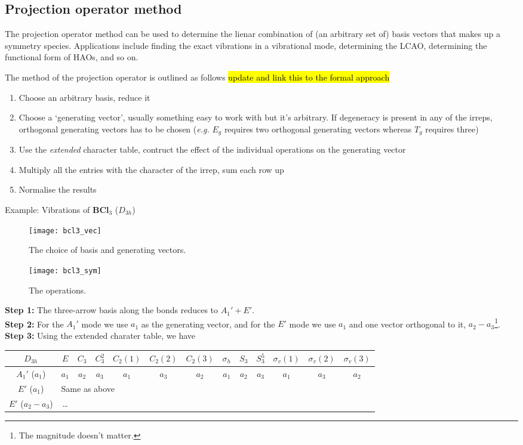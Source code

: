 \subsection{Projection operator method}
The projection operator method can be used to determine the lienar combination of (an arbitrary set of) basis vectors that makes up a symmetry species. Applications include finding the exact vibrations in a vibrational mode, determining the LCAO, determining the functional form of HAOs, and so on. \par
The method of the projection operator is outlined as follows \hl{update and link this to the formal approach}
\begin{enumerate}
	\item Choose an arbitrary basis, reduce it
	\item Choose a `generating vector', usually something easy to work with but it's arbitrary. If degeneracy is present in any of the irreps, orthogonal generating vectors has to be chosen (\emph{e.g.} $E_g$ requires two orthogonal generating vectors whereas $T_g$ requires three)
	\item Use the \emph{extended} character table, contruct the effect of the individual operations on the generating vector
	\item Multiply all the entries with the character of the irrep, sum each row up
	\item Normalise the results
\end{enumerate}
Example: Vibrations of \textbf{BCl$_3$} ($D_{3h}$)\\
\begin{figure}[H]
	\texttt{[image: bcl3\_vec]}
	\centering
	\caption{The choice of basis and generating vectors.}
	\label{fig:bcl3_vec}
\end{figure}
\begin{figure}[H]
	\texttt{[image: bcl3\_sym]}
	\centering
	\caption{The operations.}
	\label{fig:bcl3_sym}
\end{figure}
\textbf{Step 1:} The three-arrow basis along the bonds reduces to $A_1'+E'$.\\
\textbf{Step 2:} For the $A_1'$ mode we use $a_1$ as the generating vector, and for the $E'$ mode we use $a_1$ and one vector orthogonal to it, $a_2-a_3$\footnote{The magnitude doesn't matter.}. \\
\textbf{Step 3:} Using the extended charater table, we have
\begin{center}
	\begin{tabular}{c|cccccccccccc}
$D_{3h}$ & $E$ &$C_3$&$C_3^2$&$C_2(1)$&$C_2(2)$&$C_2(3)$&$\sigma_h$&$S_3$&$S_3^5$&$\sigma_v(1)$&$\sigma_v(2)$&$\sigma_v(3)$\\
\hline
$A_1'$ ($a_1$)&$a_1$&$a_2$&$a_3$&$a_1$&$a_3$&$a_2$&$a_1$&$a_2$&$a_3$&$a_1$&$a_3$&$a_2$ \\
$E'$ ($a_1$)&\multicolumn{5}{l}{Same as above}\\
$E'$ ($a_2-a_3$)&\dots
	\end{tabular}
\end{center}
